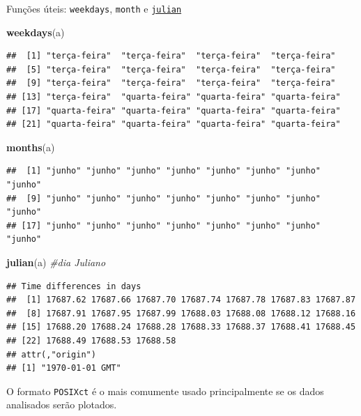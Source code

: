 \documentclass[]{book}
\newenvironment{Shaded}{\begin{snugshade}}{\end{snugshade}}
\newcommand{\KeywordTok}[1]{\textcolor[rgb]{0.13,0.29,0.53}{\textbf{#1}}}
\newcommand{\CommentTok}[1]{\textcolor[rgb]{0.56,0.35,0.01}{\textit{#1}}}
\newcommand{\NormalTok}[1]{#1}
\theoremstyle{definition}
\theoremstyle{definition}
\theoremstyle{definition}
\theoremstyle{remark}
\begin{document}
Funções úteis: \texttt{weekdays}, \texttt{month} e
\href{https://en.wikipedia.org/wiki/Julian_day}{\texttt{julian}}

\begin{Shaded}
\begin{Highlighting}[]
\KeywordTok{weekdays}\NormalTok{(a)}
\end{Highlighting}
\end{Shaded}

\begin{verbatim}
##  [1] "terça-feira"  "terça-feira"  "terça-feira"  "terça-feira" 
##  [5] "terça-feira"  "terça-feira"  "terça-feira"  "terça-feira" 
##  [9] "terça-feira"  "terça-feira"  "terça-feira"  "terça-feira" 
## [13] "terça-feira"  "quarta-feira" "quarta-feira" "quarta-feira"
## [17] "quarta-feira" "quarta-feira" "quarta-feira" "quarta-feira"
## [21] "quarta-feira" "quarta-feira" "quarta-feira" "quarta-feira"
\end{verbatim}

\begin{Shaded}
\begin{Highlighting}[]
\KeywordTok{months}\NormalTok{(a)}
\end{Highlighting}
\end{Shaded}

\begin{verbatim}
##  [1] "junho" "junho" "junho" "junho" "junho" "junho" "junho" "junho"
##  [9] "junho" "junho" "junho" "junho" "junho" "junho" "junho" "junho"
## [17] "junho" "junho" "junho" "junho" "junho" "junho" "junho" "junho"
\end{verbatim}

\begin{Shaded}
\begin{Highlighting}[]
\KeywordTok{julian}\NormalTok{(a) }\CommentTok{#dia Juliano}
\end{Highlighting}
\end{Shaded}

\begin{verbatim}
## Time differences in days
##  [1] 17687.62 17687.66 17687.70 17687.74 17687.78 17687.83 17687.87
##  [8] 17687.91 17687.95 17687.99 17688.03 17688.08 17688.12 17688.16
## [15] 17688.20 17688.24 17688.28 17688.33 17688.37 17688.41 17688.45
## [22] 17688.49 17688.53 17688.58
## attr(,"origin")
## [1] "1970-01-01 GMT"
\end{verbatim}

O formato \texttt{POSIXct} é o mais comumente usado principalmente se os
dados analisados serão plotados.
\end{document}
